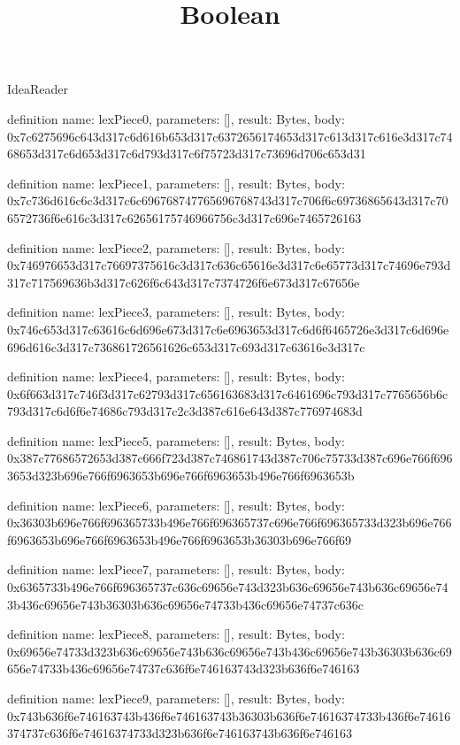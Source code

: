 \begin{lexlean}{IdeaReader}
\title{Boolean}
\begin{semanticmodule}
definition{
  name: lexPiece0,
  parameters: [],
  result: Bytes,
  body: 0x7c6275696c643d317c6d616b653d317c6372656174653d317c613d317c616e3d317c7468653d317c6d653d317c6d793d317c6f75723d317c73696d706c653d31
}

definition{
  name: lexPiece1,
  parameters: [],
  result: Bytes,
  body: 0x7c736d616c6c3d317c6c696768747765696768743d317c706f6c69736865643d317c706572736f6e616c3d317c62656175746966756c3d317c696e7465726163
}

definition{
  name: lexPiece2,
  parameters: [],
  result: Bytes,
  body: 0x746976653d317c76697375616c3d317c636c65616e3d317c6e65773d317c74696e793d317c717569636b3d317c626f6c643d317c7374726f6e673d317c67656e
}

definition{
  name: lexPiece3,
  parameters: [],
  result: Bytes,
  body: 0x746c653d317c63616c6d696e673d317c6e6963653d317c6d6f6465726e3d317c6d696e696d616c3d317c736861726561626c653d317c693d317c63616e3d317c
}

definition{
  name: lexPiece4,
  parameters: [],
  result: Bytes,
  body: 0x6f663d317c746f3d317c62793d317c656163683d317c6461696c793d317c7765656b6c793d317c6d6f6e74686c793d317c2c3d387c616e643d387c776974683d
}

definition{
  name: lexPiece5,
  parameters: [],
  result: Bytes,
  body: 0x387c77686572653d387c666f723d387c746861743d387c706c75733d387c696e766f6963653d323b696e766f6963653b696e766f6963653b496e766f6963653b
}

definition{
  name: lexPiece6,
  parameters: [],
  result: Bytes,
  body: 0x36303b696e766f696365733b496e766f696365737c696e766f696365733d323b696e766f6963653b696e766f6963653b496e766f6963653b36303b696e766f69
}

definition{
  name: lexPiece7,
  parameters: [],
  result: Bytes,
  body: 0x6365733b496e766f696365737c636c69656e743d323b636c69656e743b636c69656e743b436c69656e743b36303b636c69656e74733b436c69656e74737c636c
}

definition{
  name: lexPiece8,
  parameters: [],
  result: Bytes,
  body: 0x69656e74733d323b636c69656e743b636c69656e743b436c69656e743b36303b636c69656e74733b436c69656e74737c636f6e746163743d323b636f6e746163
}

definition{
  name: lexPiece9,
  parameters: [],
  result: Bytes,
  body: 0x743b636f6e746163743b436f6e746163743b36303b636f6e74616374733b436f6e74616374737c636f6e74616374733d323b636f6e746163743b636f6e746163
}


\end{semanticmodule}
\end{lexlean}
